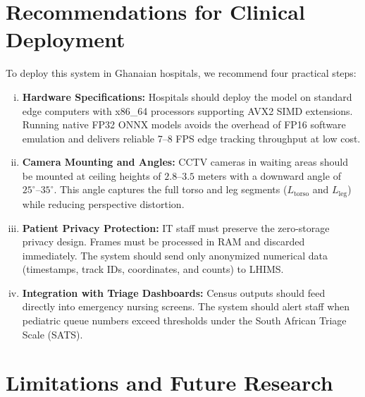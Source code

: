 \section{Recommendations for Clinical Deployment}
To deploy this system in Ghanaian hospitals, we recommend four practical steps:
\begin{enumerate}[(i)]
    \item \textbf{Hardware Specifications:} Hospitals should deploy the model on standard edge computers with x86\_64 processors supporting AVX2 SIMD extensions. Running native FP32 ONNX models avoids the overhead of FP16 software emulation and delivers reliable 7--8 FPS edge tracking throughput at low cost.
    \item \textbf{Camera Mounting and Angles:} CCTV cameras in waiting areas should be mounted at ceiling heights of $2.8\text{--}3.5$ meters with a downward angle of $25^{\circ}\text{--}35^{\circ}$. This angle captures the full torso and leg segments ($L_{\text{torso}}$ and $L_{\text{leg}}$) while reducing perspective distortion.
    \item \textbf{Patient Privacy Protection:} IT staff must preserve the zero-storage privacy design. Frames must be processed in RAM and discarded immediately. The system should send only anonymized numerical data (timestamps, track IDs, coordinates, and counts) to LHIMS.
    \item \textbf{Integration with Triage Dashboards:} Census outputs should feed directly into emergency nursing screens. The system should alert staff when pediatric queue numbers exceed thresholds under the South African Triage Scale (SATS).
\end{enumerate}

\section{Limitations and Future Research}

